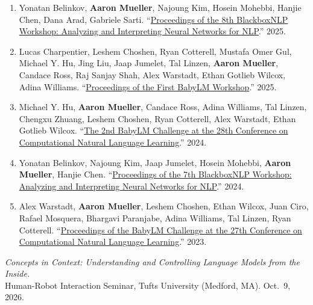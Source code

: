 \documentclass[10pt]{article}
\renewcommand{\section}[1]{\pagebreak[3]%
	\vspace{0.5\baselineskip}%
	\phantomsection\addcontentsline{toc}{section}{#1}%
	\noindent\llap{\bf\scshape\smash{\parbox[t]{\marginparwidth}{\hyphenpenalty=10000\raggedright \textcolor{black}{#1}}}}%
	\vspace{-\baselineskip}\par}
\newcommand{\halfblankline}{\quad\vspace{-0.5\baselineskip}\pagebreak[3]}
\providecommand*\titlelink[2]{\href{#1}{\textcolor{accent}{#2}}}
\begin{document}
	\begin{enumerate}[leftmargin=*, topsep=0pt, itemsep=0.25ex, partopsep=0ex, parsep=1ex, label=EW\arabic*., ref=EW\arabic*]

	\item Yonatan Belinkov, \textbf{Aaron Mueller}, Najoung Kim, Hosein Mohebbi, Hanjie Chen, Dana Arad, Gabriele Sarti. ``\titlelink{https://aclanthology.org/volumes/2025.blackboxnlp-1/}{Proceedings of the 8th BlackboxNLP Workshop: Analyzing and Interpreting Neural Networks for NLP}.'' 2025.
	
	\item Lucas Charpentier, Leshem Choshen, Ryan Cotterell, Mustafa Omer Gul, Michael Y. Hu, Jing Liu, Jaap Jumelet, Tal Linzen, \textbf{Aaron Mueller}, Candace Ross, Raj Sanjay Shah, Alex Warstadt, Ethan Gotlieb Wilcox, Adina Williams. ``\titlelink{https://aclanthology.org/volumes/2025.babylm-main/}{Proceedings of the First BabyLM Workshop}.'' 2025.
	
	\item Michael Y. Hu, \textbf{Aaron Mueller}, Candace Ross, Adina Williams, Tal Linzen, Chengxu Zhuang, Leshem Choshen, Ryan Cotterell, Alex Warstadt, Ethan Gotlieb Wilcox. ``\titlelink{https://aclanthology.org/2024.conll-babylm.0/}{The 2nd BabyLM Challenge at the 28th Conference on Computational Natural Language Learning}.'' 2024.
	
	\item Yonatan Belinkov, Najoung Kim, Jaap Jumelet, Hosein Mohebbi, \textbf{Aaron Mueller}, Hanjie Chen. ``\titlelink{https://aclanthology.org/2024.blackboxnlp-1.0/}{Proceedings of the 7th BlackboxNLP Workshop: Analyzing and Interpreting Neural Networks for NLP}.'' 2024.
	
	\item Alex Warstadt, \textbf{Aaron Mueller}, Leshem Choshen, Ethan Wilcox, Juan Ciro, Rafael Mosquera, Bhargavi Paranjabe, Adina Williams, Tal Linzen, Ryan Cotterell. ``\titlelink{https://aclanthology.org/volumes/2023.conll-babylm/}{Proceedings of the BabyLM Challenge at the 27th Conference on Computational Natural Language Learning}.'' 2023.

	\end{enumerate}

	\halfblankline
	
	
	\section{Invited\\Talks and\\Panels}
	\emph{Concepts in Context: Understanding and Controlling Language Models from the Inside.}\\
	Human-Robot Interaction Seminar, Tufts University (Medford, MA). Oct.\ 9, 2026.
\end{document}
